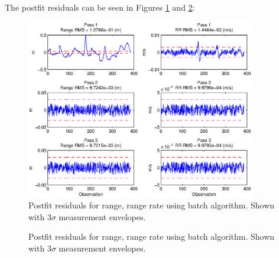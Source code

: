 \documentclass[]{aiaa-tc}%
\begin{document}
	The postfit residuals can be seen in Figures \ref{fig:BatchPostfit} and \ref{fig:CKFPostfit}:

	\begin{figure}[H]
		\centering
		\includegraphics[width = 10cm]{Batch_PostFit.eps}
		\caption{Postfit residuals for range, range rate using batch algorithm. Shown with 3$\sigma$ measurement envelopes. }
		\label{fig:BatchPostfit}
	\end{figure}	
	\begin{figure}[H]
		\centering
		\caption{Postfit residuals for range, range rate using batch algorithm. Shown with 3$\sigma$ measurement envelopes. }
		\label{fig:CKFPostfit}
	\end{figure}	
\end{document}
